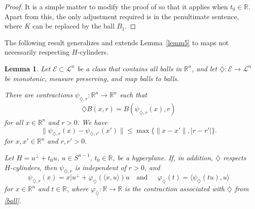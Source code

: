 \documentclass[12pt,reqno]{amsart}
\newcommand{\R}{{\mathbb R}}
\newcommand{\cL}{\mathcal L}
\newcommand{\cE}{{\mathcal E}}
\newtheorem{lem}[thm]{Lemma}
\newcommand{\di}{\diamondsuit}
\numberwithin{equation}{section}
\begin{document}
\begin{proof}
It is a simple matter to modify the proof of \cite[Lemma~6.2]{BGGK1} so that it applies when $t_0\in \R$.  Apart from this, the only adjustment required is in the penultimate sentence, where $K$ can be replaced by the ball $B_1$.
\end{proof}

The following result generalizes and extends Lemma~\ref{lemm5} to maps not necessarily respecting $H$-cylinders.

\begin{lem}\label{lem11}
Let ${\mathcal{E}}\subset {\mathcal{L}}^n$ be a class that contains all balls in $\R^n$, and let $\di:\cE\to\cL^n$ be monotonic, measure preserving, and map balls to balls.

 There are contractions $\psi_{\di,r}:\R^n\to \R^n$ such that
\begin{align}\label{eq:psi1}
\di B(x,r)=B(\psi_{\di,r}(x),r)
\end{align}
for all $x\in \R^n$ and $r>0$. We have
\begin{equation}\label{eq:pseudoContract}
\|\psi_{\di,r}(x)-\psi_{\di,r'}(x')\|\le \max\{\|x-x'\|,|r-r'|\}.
\end{equation}
for $x,x'\in \R^n$ and $r,r'>0$.

 Let $H=u^\perp+t_0u$, $u\in S^{n-1}$, $t_0\in\R$, be a hyperplane. If, in addition, $\di$ respects
$H$-cylinders, then $\psi_{\di,r}$ is independent of $r>0$, and
\begin{equation}\label{eq:omregn}
\psi_{\di,r}(x)=x|u^\perp+\varphi_{\di}(\langle x,u\rangle)u
\quad{\text{and}}~~\quad
\varphi_\di(t)=\langle \psi_\di(tu),u\rangle
\end{equation}
for $x\in \R^n$ and $t\in\R$, where $\varphi_{\di}:\R\to\R$ is the contraction associated with $\di$ from \eqref{ball}.
\end{lem}
\end{document}
